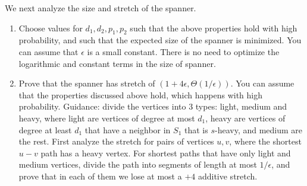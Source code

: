 \documentclass[11pt]{article}
\begin{document}
We next analyze the size and stretch of the spanner.

\begin{enumerate}
    \item Choose values for $d_1,d_2,p_1,p_2$ such that the above properties hold with high probability, and such that the expected size of the spanner is minimized. You can assume that $\epsilon$ is a small constant. There is no need to optimize the logarithmic and constant terms in the size of spanner.
    \item Prove that the spanner has stretch of $(1+4\epsilon,\Theta(1/\epsilon))$. You can assume that the properties discussed above hold, which happens with high probability.
    Guidance: divide the vertices into 3 types: light, medium and heavy, where light are vertices of degree at most $d_1$, heavy are vertices of degree at least $d_1$ that have a neighbor in $S_1$ that is $s$-heavy, and medium are the rest. First analyze the stretch for pairs of vertices $u,v$, where the shortest $u-v$ path has a heavy vertex. For shortest paths that have only light and medium vertices, divide the path into segments of length at most $1/\epsilon$, and prove that in each of them we lose at most a $+4$ additive stretch.
\end{enumerate}
\end{document}
